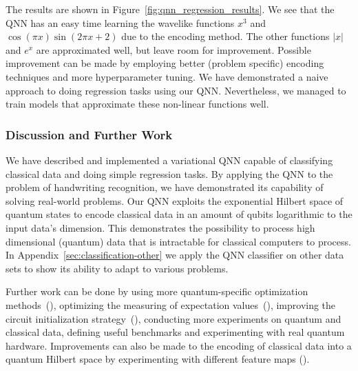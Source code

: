 \documentclass[a4paper,10pt]{article}
\begin{document}
The results are shown in Figure~\ref{fig:qnn_regression_results}.
We see that the QNN has an easy time learning the wavelike functions $x^3$ and $\cos(\pi x)\sin(2\pi x + 2)$ due to the encoding method.
The other functions $|x|$ and $e^x$ are approximated well, but leave room for improvement.
Possible improvement can be made by employing better (problem specific) encoding techniques and more hyperparameter tuning.
We have demonstrated a naive approach to doing regression tasks using our QNN.
Nevertheless, we managed to train models that approximate these non-linear functions well.

\subsubsection{Discussion and Further Work}
We have described and implemented a variational QNN capable of classifying classical data and doing simple regression tasks.
By applying the QNN to the problem of handwriting recognition, we have demonstrated its capability of solving real-world problems.
Our QNN exploits the exponential Hilbert space of quantum states to encode classical data in an amount of qubits logarithmic to the input data's dimension.
This demonstrates the possibility to process high dimensional (quantum) data that is intractable for classical computers to process.
In Appendix~\ref{sec:classification-other} we apply the QNN classifier on other data sets to show its ability to adapt to various problems.

Further work can be done by using more quantum-specific optimization methods~(\cite{stokes2019quantum}), optimizing the measuring of expectation values~(\cite{sweke2019stochastic}), improving the circuit initialization strategy~(\cite{mcclean2018barren}), conducting more experiments on quantum and classical data, defining useful benchmarks and experimenting with real quantum hardware.
Improvements can also be made to the encoding of classical data into a quantum Hilbert space by experimenting with different feature maps (\cite{schuld2019quantum}).
\end{document}
